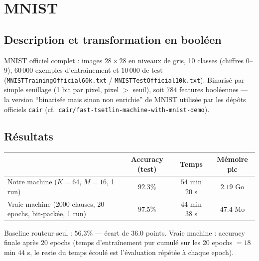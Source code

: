 \documentclass[12pt,a4paper]{article}
\newcommand{\code}[1]{\texttt{#1}}
\theoremstyle{plain}
\begin{document}
\section{MNIST}

\subsection{Description et transformation en bool\'een}

MNIST officiel complet : images $28\times 28$ en niveaux de gris, 10 classes (chiffres 0--9), $60\,000$ exemples d'entra\^inement et $10\,000$ de test (\code{MNISTTrainingOfficial60k.txt} / \code{MNISTTestOfficial10k.txt}). Binaris\'e par simple seuillage (1 bit par pixel, pixel $>$ seuil), soit $784$ features bool\'eennes --- la version ``binaris\'ee mais sinon non enrichie'' de MNIST utilis\'ee par les d\'ep\^ots officiels \code{cair} (cf.\ \code{cair/fast-tsetlin-machine-with-mnist-demo}).

\subsection{R\'esultats}

\begin{center}
\renewcommand{\arraystretch}{1.3}
\begin{tabular}{lccc}
\toprule
 & \textbf{Accuracy (test)} & \textbf{Temps} & \textbf{M\'emoire pic} \\
\midrule
Notre machine ($K{=}64$, $M{=}16$, 1 run)                & $92.3\%$  & $54$ min $20$ s & $2.19$ Go \\
Vraie machine (2000 clauses, 20 epochs, bit-pack\'ee, 1 run) & $97.5\%$  & $44$ min $38$ s & $47.4$ Mo \\
\bottomrule
\end{tabular}
\end{center}

\noindent\footnotesize Baseline routeur seul : $56.3\%$ --- \'ecart de $36.0$ points. Vraie machine : accuracy finale apr\`es 20 epochs (temps d'entra\^inement pur cumul\'e sur les 20 epochs $=18$ min $44$ s, le reste du temps \'ecoul\'e est l'\'evaluation r\'ep\'et\'ee \`a chaque epoch).\normalsize
\end{document}
